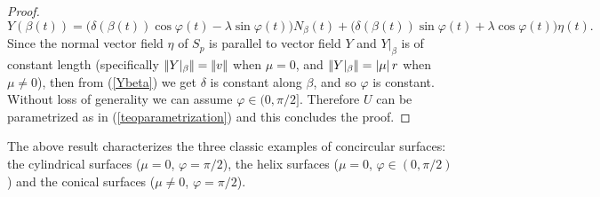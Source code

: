 \documentclass[eqnumis, pdf]{hjms}
\def\norma#1{|\kern-.3ex|#1|\kern-.3ex|}
\begin{document}
\begin{proof}
\begin{equation}
Y(\beta(t))= \big(\delta(\beta(t))\cos\varphi(t)-\lambda\sin\varphi(t)\big)N_\beta(t)+
\big(\delta(\beta(t))\sin\varphi(t)+\lambda\cos\varphi(t)\big)\eta(t).
\end{equation}
Since the normal vector field $\eta$ of $S_p$ is parallel to vector field $Y$ and $Y|_\beta$ is of constant length (specifically $\norma{Y|_\beta}=\norma{v}$ when $\mu=0$, and $\norma{Y|_\beta}=|\mu|\,r$ when $\mu\neq0$), then from (\ref{Ybeta}) we get $\delta$ is constant along $\beta$, and so $\varphi$ is constant. Without loss of generality we can assume  $\varphi\in(0,\pi/2]$. Therefore $U$ can be parametrized as in (\ref{teoparametrization}) and this concludes the proof.
\end{proof}

The above result characterizes the three classic examples of concircular surfaces: the cylindrical surfaces ($\mu=0$, $\varphi=\pi/2$), the helix surfaces ($\mu=0$, $\varphi\in(0,\pi/2)$) and the conical surfaces ($\mu\neq0$, $\varphi=\pi/2$).
\end{document}
